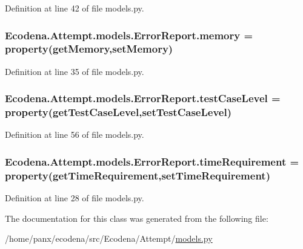 Definition at line 42 of file models.py.

\hypertarget{class_ecodena_1_1_attempt_1_1models_1_1_error_report_aa8a1d6fab3c2db3efdcc2fe98cb53194}{
\subsubsection[{memory}]{\setlength{\rightskip}{0pt plus 5cm}Ecodena.Attempt.models.ErrorReport.memory = property(getMemory,setMemory)}}
\label{df/d02/class_ecodena_1_1_attempt_1_1models_1_1_error_report_aa8a1d6fab3c2db3efdcc2fe98cb53194}


Definition at line 35 of file models.py.

\hypertarget{class_ecodena_1_1_attempt_1_1models_1_1_error_report_ad9c444fda937b61e579bd7fd78787720}{
\subsubsection[{testCaseLevel}]{\setlength{\rightskip}{0pt plus 5cm}Ecodena.Attempt.models.ErrorReport.testCaseLevel = property(getTestCaseLevel,setTestCaseLevel)}}
\label{df/d02/class_ecodena_1_1_attempt_1_1models_1_1_error_report_ad9c444fda937b61e579bd7fd78787720}


Definition at line 56 of file models.py.

\hypertarget{class_ecodena_1_1_attempt_1_1models_1_1_error_report_a4768d336f6e6359b866809f017e279a0}{
\subsubsection[{timeRequirement}]{\setlength{\rightskip}{0pt plus 5cm}Ecodena.Attempt.models.ErrorReport.timeRequirement = property(getTimeRequirement,setTimeRequirement)}}
\label{df/d02/class_ecodena_1_1_attempt_1_1models_1_1_error_report_a4768d336f6e6359b866809f017e279a0}


Definition at line 28 of file models.py.



The documentation for this class was generated from the following file:\begin{DoxyCompactItemize}
\item 
/home/panx/ecodena/src/Ecodena/Attempt/\hyperlink{_attempt_2models_8py}{models.py}\end{DoxyCompactItemize}
